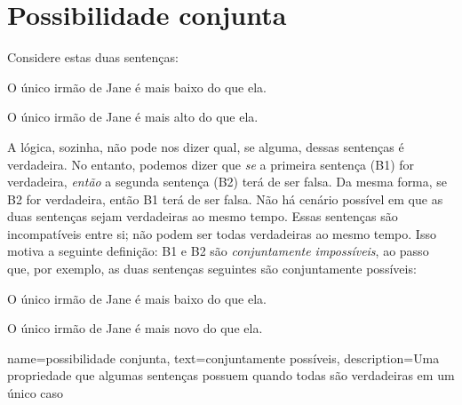 
\section{Possibilidade conjunta}

Considere estas duas sentenças:
	\begin{compactlist}
		\item[B1.] O único irmão de Jane é mais baixo do que ela.
		\item[B2.] O único irmão de Jane é mais alto do que ela.
	\end{compactlist}
A lógica, sozinha, não pode nos dizer qual, se alguma, dessas sentenças é verdadeira. No entanto, podemos dizer que \emph{se} a primeira sentença (B1) for verdadeira, \emph{então} a segunda sentença (B2) terá de ser falsa. Da mesma forma, se B2 for verdadeira, então B1 terá de ser falsa. Não há cenário possível em que as duas sentenças sejam verdadeiras ao mesmo tempo. Essas sentenças são incompatíveis entre si; não podem ser todas verdadeiras ao mesmo tempo. Isso motiva a seguinte definição:
B1 e B2 são \emph{conjuntamente impossíveis}, ao passo que, por exemplo, as duas sentenças seguintes são conjuntamente possíveis:
	\begin{compactlist}
		\item[B1.] O único irmão de Jane é mais baixo do que ela.
		\item[B3.] O único irmão de Jane é mais novo do que ela.
	\end{compactlist}

{
name=possibilidade conjunta,
text={conjuntamente possíveis},
description={Uma propriedade que algumas sentenças possuem quando todas são verdadeiras em um único caso}
}

